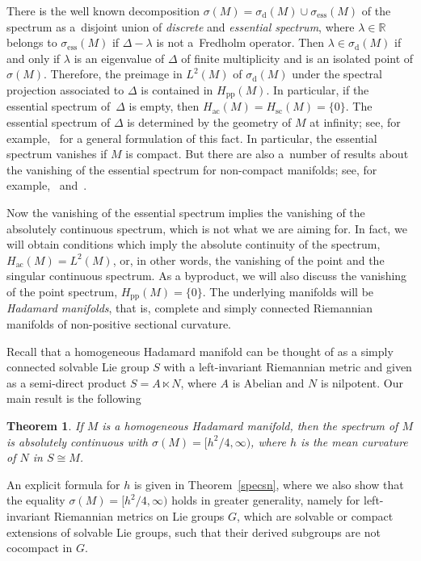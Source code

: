 \documentclass[10pt,a4paper]{amsart}
\numberwithin{equation}{section}
\newtheorem{Theorem}{Theorem}[section]
\DeclareMathOperator{\ess}{ess}
\def\p{\mathrm{pp}}
\def\d{\mathrm d}
\def\ac{\mathrm{ac}}
\def\sc{\mathrm{sc}}
\def\R{\mathbb R}
\begin{document}
There is the well known decomposition $\sigma(M)=\sigma_{\d}(M)\cup\sigma_{\ess}(M)$ of the spectrum
as a~disjoint union of \emph{discrete} and \emph{essential spectrum},
where $\lambda\in\R$ belongs to $\sigma_{\ess}(M)$ if $\Delta-\lambda$ is not a~Fredholm operator.
Then $\lambda\in\sigma_{\d}(M)$ if and only if $\lambda$ is an eigenvalue of $\Delta$
of finite multiplicity and is an isolated point of $\sigma(M)$.
Therefore, the preimage in $L^2(M)$ of $\sigma_{\d}(M)$ under the spectral projection associated to $\Delta$
is contained in $H_{\p}(M)$.
In particular, if the essential spectrum of~$\Delta$ is empty, then $H_{\ac}(M)=H_{\sc}(M)=\{0\}$.
The essential spectrum of $\Delta$ is determined by the geometry of $M$ at infinity;
see, for example,~\cite[Proposition 3.6]{BMM17} for a general formulation of this fact.
In particular, the essential spectrum vanishes if $M$ is compact.
But there are also a~number of results about the vanishing of the essential spectrum
for non-compact manifolds;
see, for example,~\cite[Theorems 1.1 and 1.2]{BLM10} and~\cite[Examples 3.7]{BMM17}.

Now the vanishing of the essential spectrum implies the vanishing of the absolutely continuous spectrum,
which is not what we are aiming for.
In fact, we will obtain conditions which imply the absolute continuity of the spectrum, $H_{\ac}(M)=L^2(M)$,
or, in other words, the vanishing of the point and the singular continuous spectrum.
As a byproduct, we will also discuss the vanishing of the point spectrum, $H_{\p}(M)=\{0\}$.
The underlying manifolds will be \emph{Hadamard manifolds}, that is,
complete and simply connected Riemannian manifolds of non-positive sectional curvature.

Recall that a homogeneous Hadamard manifold can be thought of as a simply connected solvable Lie group $S$
with a left-invariant Riemannian metric
and given as a semi-direct product $S=A\ltimes N$, where $A$ is Abelian and $N$ is nilpotent.
Our main result is the following


\begin{Theorem}\label{onlyach}
If $M$ is a homogeneous Hadamard manifold,
then the spectrum of $M$ is absolutely continuous with $\sigma(M)=\bigl[h^2/4,\infty\bigr)$,
where $h$ is the mean curvature of $N$ in $S\cong M$.
\end{Theorem}


An explicit formula for $h$ is given in Theorem~\ref{specsn},
where we also show that the equality $\sigma(M)=\bigl[h^2/4,\infty\bigr)$ holds in greater generality,
namely for left-invariant Riemannian metrics on Lie groups $G$,
which are solvable or compact extensions of solvable Lie groups,
such that their derived subgroups are not cocompact in $G$.
\end{document}
